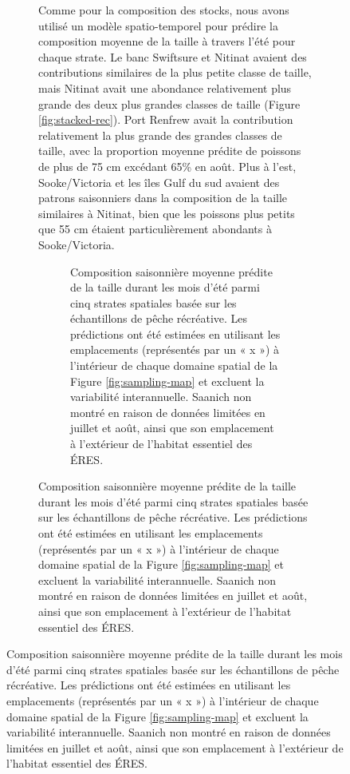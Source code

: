\begin{figure}[H]
\begin{figure}[H]
Comme pour la composition des stocks, nous avons utilisé un modèle spatio-temporel pour prédire la composition moyenne de la taille à travers l'été pour chaque strate. Le banc Swiftsure et Nitinat avaient des contributions similaires de la plus petite classe de taille, mais Nitinat avait une abondance relativement plus grande des deux plus grandes classes de taille (Figure \ref{fig:stacked-rec}). Port Renfrew avait la contribution relativement la plus grande des grandes classes de taille, avec la proportion moyenne prédite de poissons de plus de 75 cm excédant 65\% en août. Plus à l'est, Sooke/Victoria et les îles Gulf du sud avaient des patrons saisonniers dans la composition de la taille similaires à Nitinat, bien que les poissons plus petits que 55 cm étaient particulièrement abondants à Sooke/Victoria.

\begin{figure}[H]
    \centering
    \caption{Composition saisonnière moyenne prédite de la taille durant les mois d'été parmi cinq strates spatiales basée sur les échantillons de pêche récréative. Les prédictions ont été estimées en utilisant les emplacements (représentés par un « x ») à l'intérieur de chaque domaine spatial de la Figure \ref{fig:sampling-map} et excluent la variabilité interannuelle. Saanich non montré en raison de données limitées en juillet et août, ainsi que son emplacement à l'extérieur de l'habitat essentiel des ÉRES.}
    \label{fig:stacked-rec-size}
\end{figure}


\end{figure}
\end{figure}
